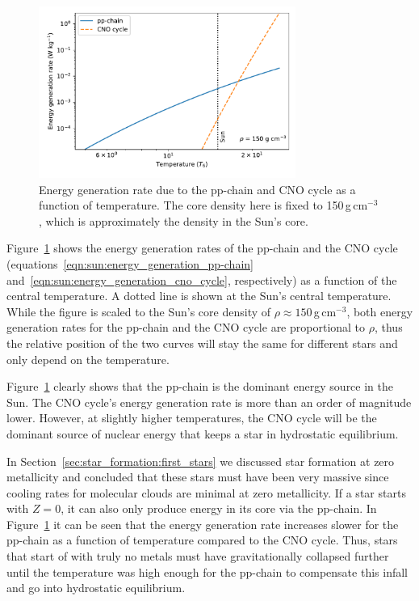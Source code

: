 \begin{figure}[tb]
    \centering
    \includegraphics[width=0.75\textwidth]{graphics/sun/energy_h_burning}
    \caption{Energy generation rate due to the \ac{pp-chain} and CNO cycle as a function of temperature. The core density here is fixed to 150\,g\,cm$^{-3}$, which is approximately the density in the Sun's core.}
    \label{fig:sun:energy_generation_hydrogen_fusion}
\end{figure}
Figure~\ref{fig:sun:energy_generation_hydrogen_fusion} shows the energy generation rates of the \ac{pp-chain} and the CNO cycle (equations~\eqref{eqn:sun:energy_generation_pp-chain} and~\eqref{eqn:sun:energy_generation_cno_cycle}, respectively) as a function of the central temperature. A dotted line is shown at the Sun's central temperature. While the figure is scaled to the Sun's core density of $\rho\approx150$\,g\,cm$^{-3}$, both energy generation rates for the \ac{pp-chain} and the CNO cycle are proportional to $\rho$, thus the relative position of the two curves will stay the same for different stars and only depend on the temperature. 

Figure~\ref{fig:sun:energy_generation_hydrogen_fusion} clearly shows that the \ac{pp-chain} is the dominant energy source in the Sun. The CNO cycle's energy generation rate is more than an order of magnitude lower. However, at slightly higher temperatures, the CNO cycle will be the dominant source of nuclear energy that keeps a star in hydrostatic equilibrium.

In Section~\ref{sec:star_formation:first_stars} we discussed star formation at zero metallicity and concluded that these stars must have been very massive since cooling rates for molecular clouds are minimal at zero metallicity. If a star starts with $Z=0$, it can also only produce energy in its core via the \ac{pp-chain}. In Figure~\ref{fig:sun:energy_generation_hydrogen_fusion} it can be seen that the energy generation rate increases slower for the \ac{pp-chain} as a function of temperature compared to the CNO cycle. Thus, stars that start of with truly no metals must have gravitationally collapsed further until the temperature was high enough for the \ac{pp-chain} to compensate this infall and go into hydrostatic equilibrium.



